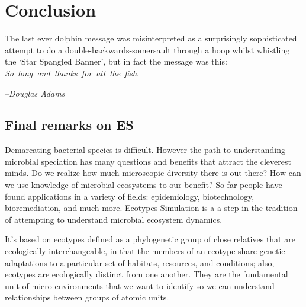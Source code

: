 \gobbletocpage
\chapter{Conclusion}
\restoretocpage

\begin{shadequote}
The last ever dolphin message was misinterpreted as a surprisingly sophisticated attempt to do a double-backwards-somersault through a hoop whilst whistling the `Star Spangled Banner', but in fact the message was this: \mbox{\emph{So long and thanks for all the fish}}. \par--\emph{Douglas Adams}
\end{shadequote}





\section{Final remarks on ES}

Demarcating bacterial species is difficult.
However the path to understanding microbial speciation has many questions and benefits that attract the cleverest minds.
Do we realize how much microscopic diversity there is out there?
How can we use knowledge of microbial ecosystems to our benefit?
So far people have found applications in a variety of fields: epidemiology, biotechnology, bioremediation, and much more.
Ecotypes Simulation is a a step in the tradition of attempting to understand microbial ecosystem dynamics.

It's based on ecotypes defined as a phylogenetic group of close relatives that are ecologically interchangeable, in that the members of an ecotype share genetic adaptations to a particular set of habitats, resources, and conditions; also, ecotypes are ecologically distinct from one another.
They are the fundamental unit of micro environments that we want to identify so we can understand relationships between groups of atomic units.

